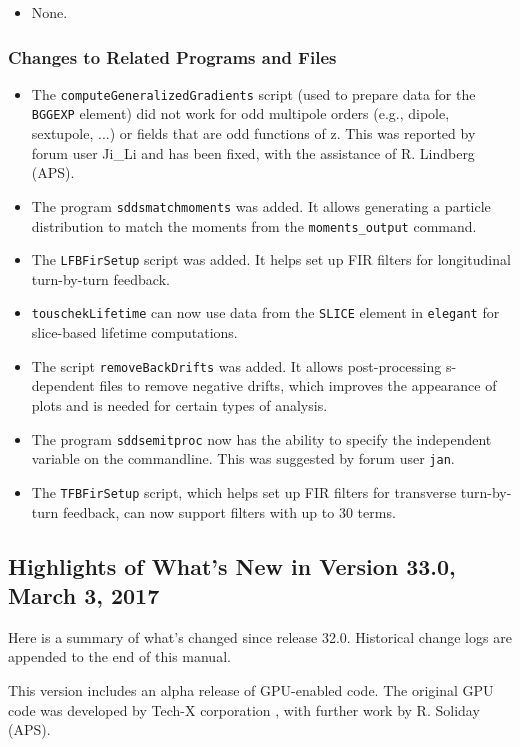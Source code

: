 \documentclass[11pt]{article}
\begin{document}
\begin{itemize}
\item None.
\end{itemize}

\subsubsection{Changes to Related Programs and Files}

\begin{itemize}
\item The \verb|computeGeneralizedGradients| script (used to prepare data for the \verb|BGGEXP| element) did not work
  for odd multipole orders (e.g., dipole, sextupole, ...) or fields that are odd functions of z. 
  This was reported by forum user Ji\_Li and has been fixed, with the assistance of R. Lindberg (APS).
\item The program \verb|sddsmatchmoments| was added. It allows generating a particle distribution to match the
  moments from the \verb|moments_output| command.
\item The \verb|LFBFirSetup| script was added. It helps set up FIR filters for longitudinal turn-by-turn feedback.
\item \verb|touschekLifetime| can now use data from the \verb|SLICE| element in {\tt elegant} for slice-based lifetime computations.
\item The script \verb|removeBackDrifts| was added. It allows post-processing s-dependent files to remove negative drifts, which
  improves the appearance of plots and is needed for certain types of analysis.
\item The program \verb|sddsemitproc| now has the ability to specify the independent variable on the commandline. This was
  suggested by forum user \verb|jan|.
\item The \verb|TFBFirSetup| script, which helps set up FIR filters for transverse turn-by-turn feedback, can now
  support filters with up to 30 terms.
\end{itemize}

\subsection{Highlights of What's New in Version 33.0, March 3, 2017}

Here is a summary of what's changed since release 32.0.
Historical change logs are appended to the end of this manual.

This version includes an alpha release of GPU-enabled code. The original GPU code was developed by 
Tech-X corporation \cite{GPU1}, with further work by R. Soliday (APS).
\end{document}

